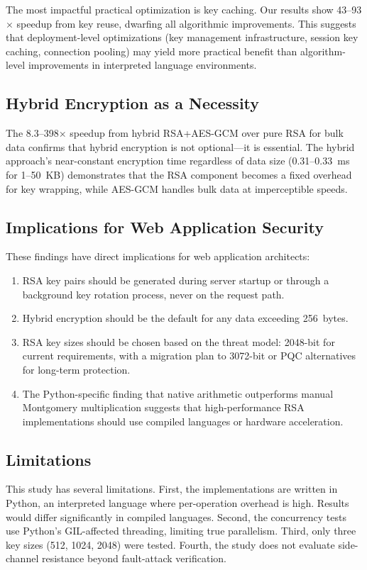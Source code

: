 \documentclass[journal]{IEEEtran}
\begin{document}
The most impactful practical optimization is key caching. Our results show 43--93$\times$ speedup from key reuse, dwarfing all algorithmic improvements. This suggests that deployment-level optimizations (key management infrastructure, session key caching, connection pooling) may yield more practical benefit than algorithm-level improvements in interpreted language environments.

\subsection{Hybrid Encryption as a Necessity}

The 8.3--398$\times$ speedup from hybrid RSA+AES-GCM over pure RSA for bulk data confirms that hybrid encryption is not optional---it is essential. The hybrid approach's near-constant encryption time regardless of data size (0.31--0.33~ms for 1--50~KB) demonstrates that the RSA component becomes a fixed overhead for key wrapping, while AES-GCM handles bulk data at imperceptible speeds.

\subsection{Implications for Web Application Security}

These findings have direct implications for web application architects:
\begin{enumerate}
    \item RSA key pairs should be generated during server startup or through a background key rotation process, never on the request path.
    \item Hybrid encryption should be the default for any data exceeding 256~bytes.
    \item RSA key sizes should be chosen based on the threat model: 2048-bit for current requirements, with a migration plan to 3072-bit or PQC alternatives for long-term protection.
    \item The Python-specific finding that native arithmetic outperforms manual Montgomery multiplication suggests that high-performance RSA implementations should use compiled languages or hardware acceleration.
\end{enumerate}

\subsection{Limitations}

This study has several limitations. First, the implementations are written in Python, an interpreted language where per-operation overhead is high. Results would differ significantly in compiled languages. Second, the concurrency tests use Python's GIL-affected threading, limiting true parallelism. Third, only three key sizes (512, 1024, 2048) were tested. Fourth, the study does not evaluate side-channel resistance beyond fault-attack verification.
\end{document}
